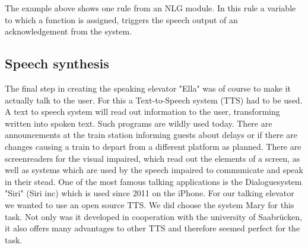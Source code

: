 \documentclass[a4paper, 12pt]{article}
\begin{document}
The example above shows one rule from an NLG module. 
In this rule a variable to which a function  is assigned, triggers the speech output of an acknowledgement from the system.

\subsection{Speech synthesis}
The final step in creating the speaking elevator "Ella" was of course to make it actually talk to the user.
For this a Text-to-Speech system (TTS) had to be used. A text to speech system will read out information to the user, transforming written into spoken text.
Such programs are wildly used today. 
There are announcements at the train station informing guests about delays or if there are changes causing a train to depart from a different platform as planned.
There are screenreaders for the visual impaired, which read out the elements of a screen, as well as systems which are used by the speech impaired to communicate and speak in their stead.
One of the most famous talking applications is the Dialoguesystem "Siri" (Siri inc) which is used since 2011 on the iPhone. \newline \newline
For our talking elevator we wanted to use an open source TTS. 
We did choose the system Mary for this task.
Not only was it developed in cooperation with the university of Saabrücken, it also offers many advantages to other TTS and therefore seemed perfect for the task.\newline
\end{document}
